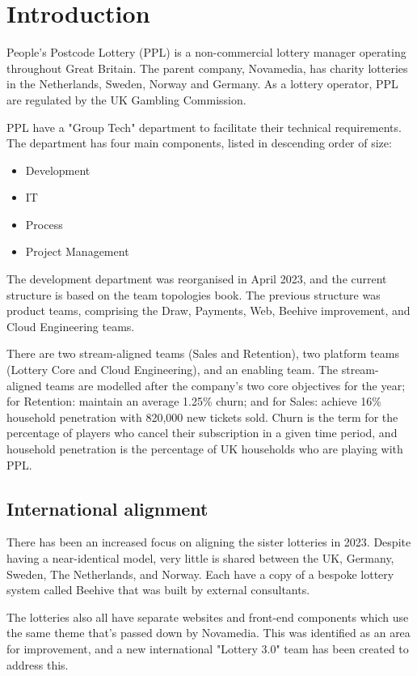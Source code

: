 \section{Introduction}
People's Postcode Lottery (PPL) is a non-commercial lottery manager operating
throughout Great Britain. The parent company, Novamedia, has charity lotteries
in the Netherlands, Sweden, Norway and Germany. As a lottery operator, PPL are
regulated by the UK Gambling Commission.

PPL have a "Group Tech" department to facilitate their technical requirements.
The department has four main components, listed in descending order of size:

\begin{itemize}
  \item{Development}
  \item{IT}
  \item{Process}
  \item{Project Management}
\end{itemize}

The development department was reorganised in April 2023, and the current
structure is based on the team topologies book. The previous structure was
product teams, comprising the Draw, Payments, Web, Beehive improvement, and
Cloud Engineering teams.

There are two stream-aligned teams (Sales and Retention), two platform teams
(Lottery Core and Cloud Engineering), and an enabling team. The stream-aligned
teams are modelled after the company's two core objectives for the year;
for Retention: maintain an average 1.25\% churn; and for Sales: achieve 16\%
household penetration with 820,000 new tickets sold. Churn is the term for the
percentage of players who cancel their subscription in a given time period, and
household penetration is the percentage of UK households who are playing with
PPL.

\subsection{International alignment}

There has been an increased focus on aligning the sister lotteries in 2023.
Despite having a near-identical model, very little is shared between the UK,
Germany, Sweden, The Netherlands, and Norway. Each have a copy of a bespoke
lottery system called Beehive that was built by external consultants. %

The lotteries also all have separate websites and front-end components which
use the same theme that's passed down by Novamedia. This was identified as
an area for improvement, and a new international "Lottery 3.0" team has been
created to address this.

